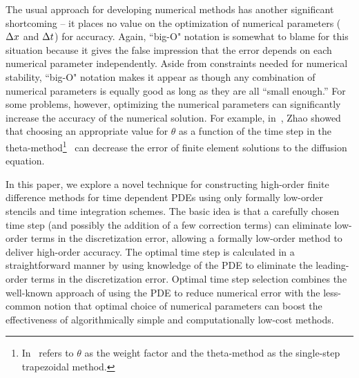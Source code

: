 \documentclass[oneeqnum,onefignum,onetabnum,onethmnum]{siamltex}
\begin{document}
The usual approach for developing numerical methods has another significant
shortcoming -- it places no value on the optimization of numerical parameters 
(\eg $\Delta x$ and $\Delta t$) for accuracy.  Again, ``big-O" notation is 
somewhat to blame for this situation because it gives the false impression 
that the error depends on each numerical parameter independently.  Aside
from constraints needed for numerical stability, ``big-O" notation makes 
it appear as though any combination of numerical parameters is equally good 
as long as they are all ``small enough.''  For some problems, however, 
optimizing the numerical parameters can significantly increase the accuracy
of the numerical solution.  For example, in~\cite{zhao_2006}, Zhao showed 
that choosing an appropriate value for $\theta$ as a function of the time 
step in the theta-method\footnote{In~\cite{zhao_2006} refers to $\theta$ as 
the weight factor and the theta-method as the single-step trapezoidal 
method.}~\cite{iserles_book, gko_book} can decrease the error of finite 
element solutions to the diffusion equation. 

In this paper, we explore a novel technique for constructing high-order 
finite difference methods for time dependent PDEs using only formally 
low-order stencils and time integration schemes.  The basic idea is that a 
carefully chosen time step (and possibly the addition of a few correction 
terms) can eliminate low-order terms in the discretization error, allowing a 
formally low-order method to deliver high-order accuracy.  The optimal time 
step is calculated in a straightforward manner by using knowledge of the 
PDE to eliminate the leading-order terms in the discretization error.  
Optimal time step selection combines the well-known approach of using 
the PDE to reduce numerical error with the less-common notion that optimal 
choice of numerical parameters can boost the effectiveness of algorithmically 
simple and computationally low-cost methods.  
\end{document}

